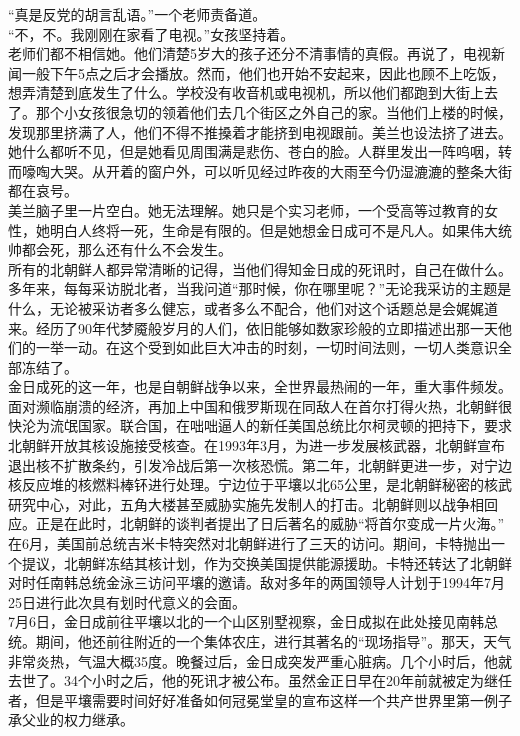 “真是反党的胡言乱语。”一个老师责备道。\\

“不，不。我刚刚在家看了电视。”女孩坚持着。\\

老师们都不相信她。他们清楚5岁大的孩子还分不清事情的真假。再说了，电视新闻一般下午5点之后才会播放。然而，他们也开始不安起来，因此也顾不上吃饭，想弄清楚到底发生了什么。学校没有收音机或电视机，所以他们都跑到大街上去了。那个小女孩很急切的领着他们去几个街区之外自己的家。当他们上楼的时候，发现那里挤满了人，他们不得不推搡着才能挤到电视跟前。美兰也设法挤了进去。她什么都听不见，但是她看见周围满是悲伤、苍白的脸。人群里发出一阵呜咽，转而嚎啕大哭。从开着的窗户外，可以听见经过昨夜的大雨至今仍湿漉漉的整条大街都在哀号。\\

美兰脑子里一片空白。她无法理解。她只是个实习老师，一个受高等过教育的女性，她明白人终将一死，生命是有限的。但是她想金日成可不是凡人。如果伟大统帅都会死，那么还有什么不会发生。\\

所有的北朝鲜人都异常清晰的记得，当他们得知金日成的死讯时，自己在做什么。多年来，每每采访脱北者，当我问道“那时候，你在哪里呢？”无论我采访的主题是什么，无论被采访者多么健忘，或者多么不配合，他们对这个话题总是会娓娓道来。经历了90年代梦魇般岁月的人们，依旧能够如数家珍般的立即描述出那一天他们的一举一动。在这个受到如此巨大冲击的时刻，一切时间法则，一切人类意识全部冻结了。\\

金日成死的这一年，也是自朝鲜战争以来，全世界最热闹的一年，重大事件频发。面对濒临崩溃的经济，再加上中国和俄罗斯现在同敌人在首尔打得火热，北朝鲜很快沦为流氓国家。联合国，在咄咄逼人的新任美国总统比尔柯灵顿的把持下，要求北朝鲜开放其核设施接受核查。在1993年3月，为进一步发展核武器，北朝鲜宣布退出核不扩散条约，引发冷战后第一次核恐慌。第二年，北朝鲜更进一步，对宁边核反应堆的核燃料棒钚进行处理。宁边位于平壤以北65公里，是北朝鲜秘密的核武研究中心，对此，五角大楼甚至威胁实施先发制人的打击。北朝鲜则以战争相回应。正是在此时，北朝鲜的谈判者提出了日后著名的威胁“将首尔变成一片火海。”\\

在6月，美国前总统吉米卡特突然对北朝鲜进行了三天的访问。期间，卡特抛出一个提议，北朝鲜冻结其核计划，作为交换美国提供能源援助。卡特还转达了北朝鲜对时任南韩总统金泳三访问平壤的邀请。敌对多年的两国领导人计划于1994年7月25日进行此次具有划时代意义的会面。\\

7月6日，金日成前往平壤以北的一个山区别墅视察，金日成拟在此处接见南韩总统。期间，他还前往附近的一个集体农庄，进行其著名的“现场指导”。那天，天气非常炎热，气温大概35度。晚餐过后，金日成突发严重心脏病。几个小时后，他就去世了。34个小时之后，他的死讯才被公布。虽然金正日早在20年前就被定为继任者，但是平壤需要时间好好准备如何冠冕堂皇的宣布这样一个共产世界里第一例子承父业的权力继承。\\

